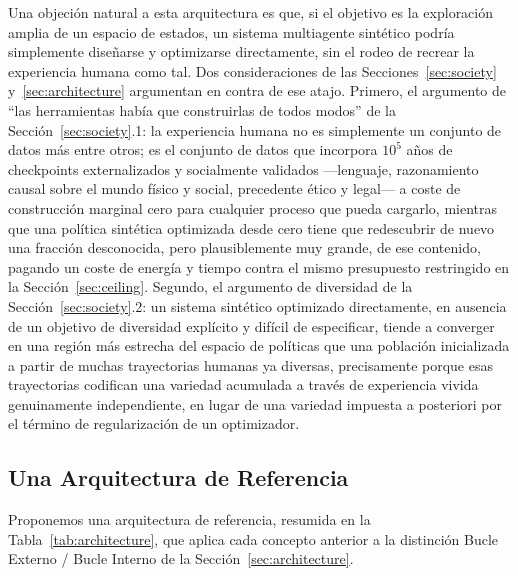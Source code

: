 \documentclass[11pt]{article}
\begin{document}
Una objeción natural a esta arquitectura es que, si el objetivo es la exploración amplia de un espacio de estados, un sistema multiagente sintético podría simplemente diseñarse y optimizarse directamente, sin el rodeo de recrear la experiencia humana como tal. Dos consideraciones de las Secciones~\ref{sec:society} y~\ref{sec:architecture} argumentan en contra de ese atajo. Primero, el argumento de ``las herramientas había que construirlas de todos modos'' de la Sección~\ref{sec:society}.1: la experiencia humana no es simplemente un conjunto de datos más entre otros; es el conjunto de datos que incorpora $10^5$ años de checkpoints externalizados y socialmente validados —lenguaje, razonamiento causal sobre el mundo físico y social, precedente ético y legal— a coste de construcción marginal cero para cualquier proceso que pueda cargarlo, mientras que una política sintética optimizada desde cero tiene que redescubrir de nuevo una fracción desconocida, pero plausiblemente muy grande, de ese contenido, pagando un coste de energía y tiempo contra el mismo presupuesto restringido en la Sección~\ref{sec:ceiling}. Segundo, el argumento de diversidad de la Sección~\ref{sec:society}.2: un sistema sintético optimizado directamente, en ausencia de un objetivo de diversidad explícito y difícil de especificar, tiende a converger en una región más estrecha del espacio de políticas que una población inicializada a partir de muchas trayectorias humanas ya diversas, precisamente porque esas trayectorias codifican una variedad acumulada a través de experiencia vivida genuinamente independiente, en lugar de una variedad impuesta a posteriori por el término de regularización de un optimizador.

\subsection{Una Arquitectura de Referencia}

Proponemos una arquitectura de referencia, resumida en la Tabla~\ref{tab:architecture}, que aplica cada concepto anterior a la distinción Bucle Externo / Bucle Interno de la Sección~\ref{sec:architecture}.
\end{document}
